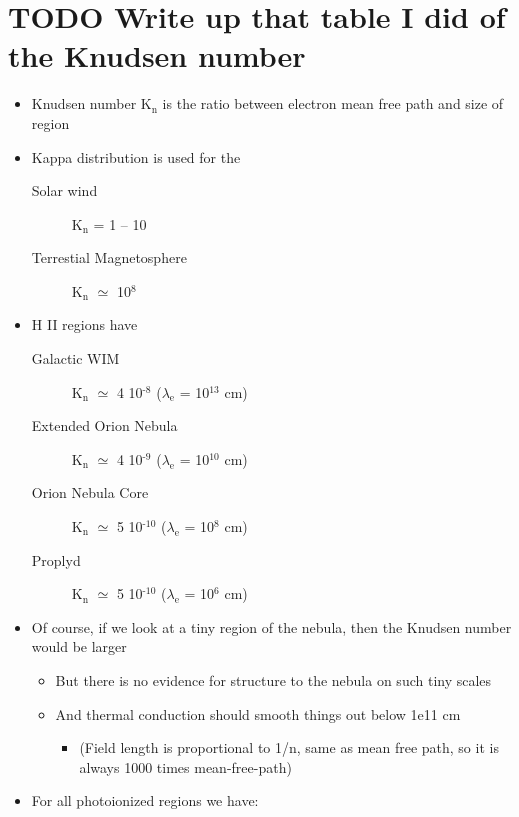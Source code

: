\documentclass[11pt]{article}
\begin{document}
\section{{\bfseries\sffamily TODO} Write up that table I did of the Knudsen number}
\label{sec:orgheadline30}
\begin{itemize}
\item Knudsen number K\(_{\text{n}}\) is the ratio between electron mean free path and size of region
\item Kappa distribution is used for the
\begin{description}
\item[{Solar wind}] K\(_{\text{n}}\) = 1 -- 10
\item[{Terrestial Magnetosphere}] K\(_{\text{n}}\) \(\simeq\) 10\(^{\text{8}}\)
\end{description}
\item H II regions have
\begin{description}
\item[{Galactic WIM}] K\(_{\text{n}}\) \(\simeq\) 4 \texttimes{} 10\(^{\text{-8}}\) (\(\lambda_{\text{e}}\) = 10\(^{\text{13}}\) cm)
\item[{Extended Orion Nebula}] K\(_{\text{n}}\) \(\simeq\) 4 \texttimes{} 10\(^{\text{-9}}\) (\(\lambda_{\text{e}}\) = 10\(^{\text{10}}\) cm)
\item[{Orion Nebula Core}] K\(_{\text{n}}\) \(\simeq\) 5 \texttimes{} 10\(^{\text{-10}}\) (\(\lambda_{\text{e}}\) = 10\(^{\text{8}}\) cm)
\item[{Proplyd}] K\(_{\text{n}}\) \(\simeq\) 5 \texttimes{} 10\(^{\text{-10}}\) (\(\lambda_{\text{e}}\) = 10\(^{\text{6}}\) cm)
\end{description}
\item Of course, if we look at a tiny region of the nebula, then the Knudsen number would be larger
\begin{itemize}
\item But there is no evidence for structure to the nebula on such tiny scales
\item And thermal conduction should smooth things out below 1e11 cm
\begin{itemize}
\item (Field length is proportional to 1/n, same as mean free path, so it is always 1000 times mean-free-path)
\end{itemize}
\end{itemize}
\item For all photoionized regions we have:
\begin{itemize}

\end{itemize}
\end{itemize}
\end{document}

